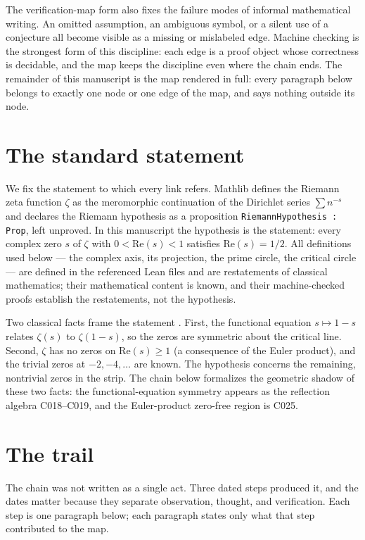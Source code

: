 \documentclass[sigplan,10pt,anonymous,review]{acmart}
\begin{document}
The verification-map form also fixes the failure modes of informal
mathematical writing. An omitted assumption, an ambiguous symbol, or a
silent use of a conjecture all become visible as a missing or mislabeled
edge. Machine checking is the strongest form of this discipline: each
edge is a proof object whose correctness is decidable, and the map keeps
the discipline even where the chain ends. The remainder of this
manuscript is the map rendered in full: every paragraph below belongs to
exactly one node or one edge of the map, and says nothing outside its
node.

\section{The standard statement}

We fix the statement to which every link refers. Mathlib defines the
Riemann zeta function $\zeta$ as the meromorphic continuation of the
Dirichlet series $\sum n^{-s}$ and declares the Riemann hypothesis as a
proposition \texttt{RiemannHypothesis : Prop}, left unproved. In this
manuscript the hypothesis is the statement: every complex zero $s$ of
$\zeta$ with $0 < \mathrm{Re}(s) < 1$ satisfies $\mathrm{Re}(s) = 1/2$.
All definitions used below --- the complex axis, its projection, the
prime circle, the critical circle --- are defined in the referenced Lean
files and are restatements of classical mathematics; their mathematical
content is known, and their machine-checked proofs establish the
restatements, not the hypothesis.

Two classical facts frame the statement \cite{edwards1974riemann}.
First, the functional equation $s \mapsto 1-s$ relates $\zeta(s)$ to
$\zeta(1-s)$, so the zeros are symmetric about the critical line.
Second, $\zeta$ has no zeros on $\mathrm{Re}(s) \ge 1$ (a consequence of
the Euler product), and the trivial zeros at $-2, -4, \ldots$ are known.
The hypothesis concerns the remaining, nontrivial zeros in the strip.
The chain below formalizes the geometric shadow of these two facts: the
functional-equation symmetry appears as the reflection algebra
C018--C019, and the Euler-product zero-free region is C025.

\section{The trail}

The chain was not written as a single act. Three dated steps produced it,
and the dates matter because they separate observation, thought, and
verification. Each step is one paragraph below; each paragraph states
only what that step contributed to the map.
\end{document}

